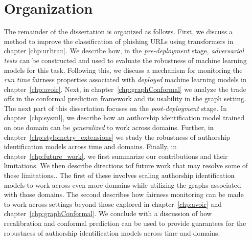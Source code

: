 \section{Organization}
The remainder of the dissertation is organized as follows. 
First, we discuss a method to improve the classification of phishing URLs using transformers in chapter \ref{chp:urltran}.
We describe how, in the \textit{pre-deployment} stage, \textit{adversarial tests} can be constructed and used to evaluate the robustness of machine learning models for this task.
Following this, we discuss a mechanism for monitoring the \textit{run time} fairness properties associated with \textit{deployed} machine learning models in chapter~\ref{chp:avoir}.
Next, in chapter~\ref{chp:graphConformal} we analyze the trade offs in the conformal prediction framework and its usability in the graph setting.
The next part of this dissertation focuses on the \emph{post-deployment} stage.
In chapter~\ref{chp:sysml}, we describe how an authorship identification model trained on one domain can be \textit{generalized} to work across domains.
Further, in chapter~\ref*{chp:stylometry_extensions} we study the robustness of authorship identification models across time and domains.
Finally, in chapter~\ref{chp:future_work}, we first summarize our contributions and their limitations.
We then describe directions tof future work that may resolve some of these limitations..
The first of these involves scaling authorship identification models to work across even more domains while utilizing the graphs associated with those domains.
The second describes how fairness monitoring can be made to work across settings beyond those explored in chapter~\ref{chp:avoir} and chapter~\ref{chp:graphConformal}.
We conclude with a discussion of how recalibration and conformal prediction can be used to provide guarantees for the robustness of authorship identification models across time and domains.


\endinput